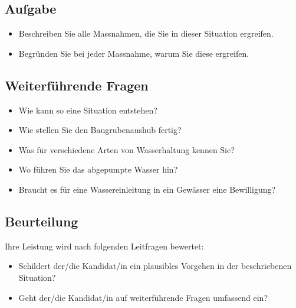 \subsection*{Aufgabe}
\begin{itemize}
    \item Beschreiben Sie alle Massnahmen, die Sie in dieser Situation ergreifen.
    \item Begründen Sie bei jeder Massnahme, warum Sie diese ergreifen.
\end{itemize}

\subsection*{Weiterführende Fragen}
\begin{itemize}
    \item Wie kann so eine Situation entstehen?
    \item Wie stellen Sie den Baugrubenaushub fertig?
    \item Was für verschiedene Arten von Wasserhaltung kennen Sie?
    \item Wo führen Sie das abgepumpte Wasser hin?
    \item Braucht es für eine Wassereinleitung in ein Gewässer eine Bewilligung?
\end{itemize}

\subsection*{Beurteilung}

Ihre Leistung wird nach folgenden Leitfragen bewertet:

\begin{itemize}[noitemsep]
    \item Schildert der/die Kandidat/in ein plausibles Vorgehen in der beschriebenen Situation?
    \item Geht der/die Kandidat/in auf weiterführende Fragen umfassend ein?
\end{itemize}



